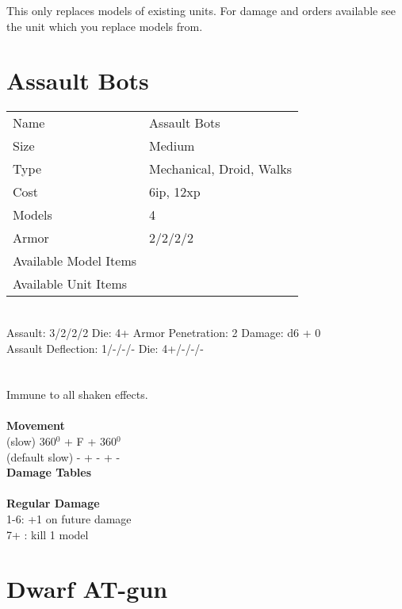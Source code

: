 This only replaces models of existing units. For damage and orders available see the unit which you replace models from.



\pagebreak

\section{ Assault Bots }

\begin{tabular}{ll}
  Name & Assault Bots \\
  Size & Medium\\
  Type & Mechanical, Droid, Walks\\
  Cost & 6ip, 12xp\\
  Models & 4\\
  Armor & 2/2/2/2\\
  Available Model Items &  \\
  Available Unit Items &  \\
\end{tabular}

\ \\
Assault: 3/2/2/2 Die: 4+ Armor Penetration: 2 Damage: d6 + 0 \\
Assault Deflection: 1/-/-/- Die: 4+/-/-/-\\
\indent  \\
\ \\
Immune to all shaken effects.
\ \\


\ \\ {\bf Movement } \\
(slow) 360$^0$ + F + 360$^0$ \\
(default slow) - + - + - \\



{\bf Damage Tables} \\
\ \\ {\bf Regular Damage } \\
1-6: +1 on future damage \\
7+ : kill 1 model \\









\pagebreak

\section{ Dwarf AT-gun }

